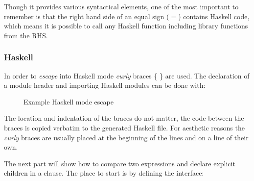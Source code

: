 \documentclass[twoside, titlepage, openright, a4paper]{book}
\newcommand{\Conid}[1]{\mathit{#1}}
\def\resethooks{%
  \global\let\SaveRestoreHook\empty
  \global\let\ColumnHook\empty}
\newlength{\blanklineskip}
\let\hspre\empty
\let\hspost\empty
\begin{document}
Though it provides various syntactical elements, one of the most important to remember is that the right hand side of an equal sign ($=$) contains Haskell code, which means it is possible to call any Haskell function including library functions from the RHS. 

\subsubsection{Haskell}
In order to \emph{escape} into Haskell mode \emph{curly} braces \{ \} are used. The declaration of a module header and importing Haskell modules can be done with:

\begin{figure}[!h]
\resethooks
\caption{Example Haskell mode escape}
\end{figure}

The location and indentation of the braces do not matter, the code between the braces is copied verbatim to the generated Haskell file. For aesthetic reasons the \emph{curly} braces are usually placed at the beginning of the lines and on a line of their own. 

The next part will show how to compare two expressions and declare  explicit children in a clause. The place to start is by defining the interface:
\end{document}
